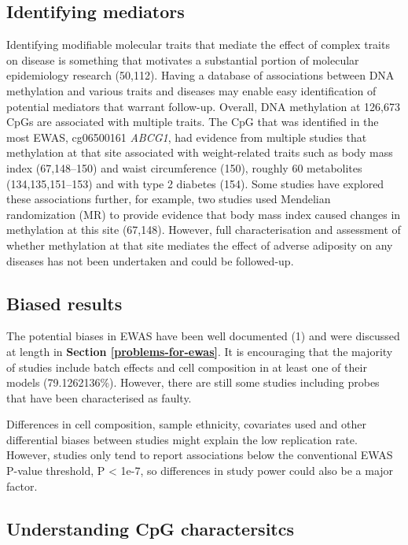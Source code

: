 \documentclass[11pt,oneside]{bristolthesis}
\begin{document}
\hypertarget{identifying-mediators}{%
\subsection{Identifying mediators}\label{identifying-mediators}}

Identifying modifiable molecular traits that mediate the effect of complex traits on disease is something that motivates a substantial portion of molecular epidemiology research (50,112). Having a database of associations between DNA methylation and various traits and diseases may enable easy identification of potential mediators that warrant follow-up. Overall, DNA methylation at 126,673 CpGs are associated with multiple traits. The CpG that was identified in the most EWAS, cg06500161 \emph{ABCG1}, had evidence from multiple studies that methylation at that site associated with weight-related traits such as body mass index (67,148--150) and waist circumference (150), roughly 60 metabolites (134,135,151--153) and with type 2 diabetes (154). Some studies have explored these associations further, for example, two studies used Mendelian randomization (MR) to provide evidence that body mass index caused changes in methylation at this site (67,148). However, full characterisation and assessment of whether methylation at that site mediates the effect of adverse adiposity on any diseases has not been undertaken and could be followed-up.

\hypertarget{biased-results}{%
\subsection{Biased results}\label{biased-results}}

The potential biases in EWAS have been well documented (1) and were discussed at length in \textbf{Section \ref{problems-for-ewas}}. It is encouraging that the majority of studies include batch effects and cell composition in at least one of their models (79.1262136\%). However, there are still some studies including probes that have been characterised as faulty.

Differences in cell composition, sample ethnicity, covariates used and other differential biases between studies might explain the low replication rate. However, studies only tend to report associations below the conventional EWAS P-value threshold, P \textless{} 1e-7, so differences in study power could also be a major factor.

\hypertarget{understanding-cpg-characteristics}{%
\subsection{Understanding CpG charactersitcs}\label{understanding-cpg-characteristics}}
\end{document}
